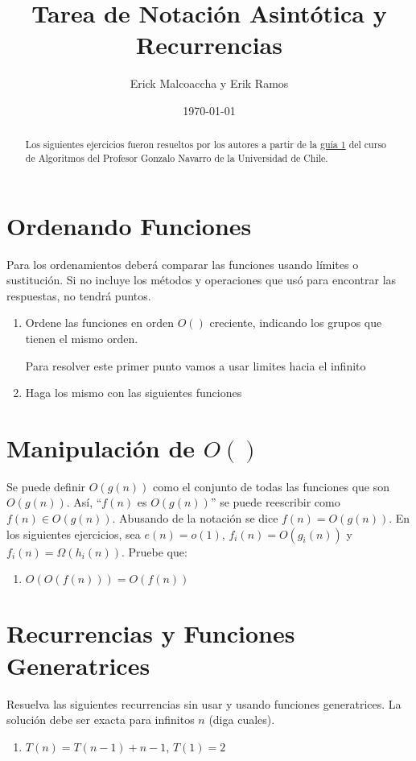\documentclass{practicaEPCC}
\title{Tarea de Notación Asintótica y Recurrencias}
\author{Erick Malcoaccha y Erik Ramos}
\date{\today}
\begin{document}
\maketitle
\begin{abstract}
Los siguientes ejercicios fueron resueltos por los autores a partir de la \href{https://users.dcc.uchile.cl/~gnavarro/cc40a/guia1.ps.gz}{guía 1} del curso de Algoritmos del Profesor Gonzalo Navarro de la Universidad de Chile.
    
\end{abstract}
\section{Ordenando Funciones}
Para los ordenamientos deberá comparar las funciones usando límites o sustitución. Si no incluye los métodos y operaciones que usó para encontrar las respuestas, no tendrá puntos.
\begin{enumerate}
  \item Ordene las funciones en orden $O()$ creciente, indicando los grupos que tienen el mismo orden.

    Para resolver este primer punto vamos a usar limites hacia el infinito
    \item Haga los mismo con las siguientes funciones

\end{enumerate}

\section{Manipulación de $O()$}
Se puede definir $O(g(n))$ como el conjunto de todas las funciones que son $O(g(n))$. Así, ``$f(n)$ es $O(g(n))$'' se puede reescribir como $f(n) \in O(g(n))$. Abusando de la notación se dice $f(n)=O(g(n))$.
En los siguientes ejercicios, sea $e(n) = o(1)$, $f_i(n) = O(g_i(n))$ y $f_i(n) = \Omega(h_i(n))$. Pruebe que:

\begin{enumerate}
    \item $O(O(f(n))) = O(f(n))$
\end{enumerate}

\section{Recurrencias y Funciones Generatrices}
Resuelva las siguientes recurrencias sin usar y usando funciones generatrices. La solución debe ser exacta para infinitos $n$ (diga cuales).

\begin{enumerate}
    \item $T(n) = T(n - 1) + n - 1$, $T(1) = 2$
\end{enumerate}
\end{document}
